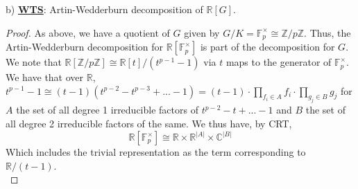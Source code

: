 \documentclass{article}
\newcommand{\bb}[1]{\mathbb{#1}}
\newcommand{\iso}{\cong}
\begin{document}
  b) \textbf{\underline{WTS}}: Artin-Wedderburn decomposition of $\bb{R}[G]$.
  \begin{proof}
    As above, we have a quotient of $G$ given by $G/K = \bb{F}_{p}^{\times} \iso \bb{Z}/p\bb{Z}$. Thus, the Artin-Wedderburn decomposition for $\bb{R}[\bb{F}_{p}^{\times}]$ is part of the decomposition for $G$. We note that $\bb{R}[\bb{Z}/p\bb{Z}] \iso \bb{R}[t]/(t^{p-1}-1)$ via $t$ maps to the generator of $\bb{F}_{p}^{\times}$. We have that over $\bb{R}$, $t^{p-1}-1 \iso (t-1)(t^{p-2}-t^{p-3}+...-1) = (t-1) \cdot \prod_{f_{i} \in A}f_{i} \cdot \prod_{g_{j} \in B}g_{j}$ for $A$ the set of all degree 1 irreducible factors of $t^{p-2}-t+...-1$ and $B$ the set of all degree 2 irreducible factors of the same. We thus have, by CRT,
    \[
      \bb{R}[\bb{F}_{p}^{\times}] \iso \bb{R} \times \bb{R}^{|A|} \times \bb{C}^{|B|}
    \]
    Which includes the trivial representation as the term corresponding to $\bb{R}/(t-1)$. \\


\end{proof}
\end{document}
